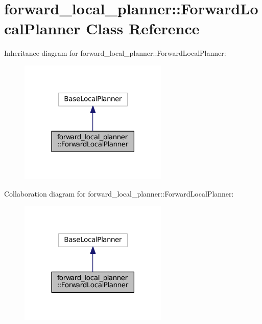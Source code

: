 \hypertarget{classforward__local__planner_1_1ForwardLocalPlanner}{}\section{forward\+\_\+local\+\_\+planner\+:\+:Forward\+Local\+Planner Class Reference}
\label{classforward__local__planner_1_1ForwardLocalPlanner}


Inheritance diagram for forward\+\_\+local\+\_\+planner\+:\+:Forward\+Local\+Planner\+:
\nopagebreak
\begin{figure}[H]
\begin{center}
\leavevmode
\includegraphics[width=201pt]{classforward__local__planner_1_1ForwardLocalPlanner__inherit__graph}
\end{center}
\end{figure}


Collaboration diagram for forward\+\_\+local\+\_\+planner\+:\+:Forward\+Local\+Planner\+:
\nopagebreak
\begin{figure}[H]
\begin{center}
\leavevmode
\includegraphics[width=201pt]{classforward__local__planner_1_1ForwardLocalPlanner__coll__graph}
\end{center}
\end{figure}
